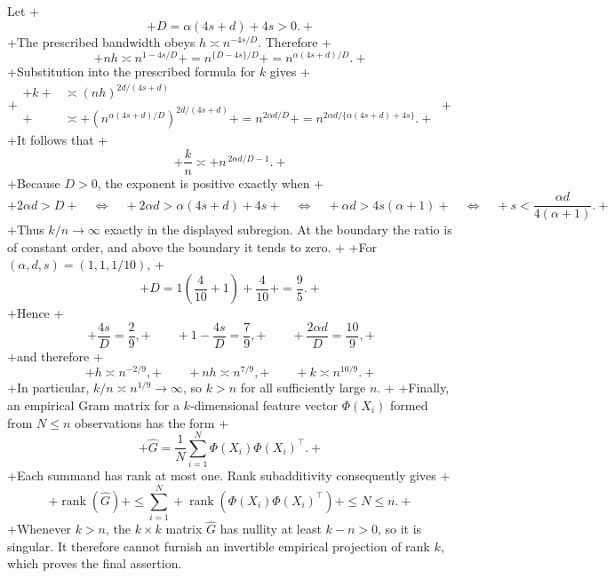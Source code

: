 Let
+\[
+D=\alpha(4s+d)+4s>0.
+\]
+The prescribed bandwidth obeys \(h\asymp n^{-4s/D}\). Therefore
+\[
+nh\asymp n^{1-4s/D}
+=n^{\{D-4s\}/D}
+=n^{\alpha(4s+d)/D}.
+\]
+Substitution into the prescribed formula for \(k\) gives
+\[
+\begin{aligned}
+k
+&\asymp(nh)^{2d/(4s+d)}\\
+&\asymp
+\left(n^{\alpha(4s+d)/D}\right)^{2d/(4s+d)}
+=n^{2\alpha d/D}
+=n^{2\alpha d/\{\alpha(4s+d)+4s\}}.
+\end{aligned}
+\]
+It follows that
+\[
+\frac{k}{n}\asymp
+n^{\,2\alpha d/D-1}.
+\]
+Because \(D>0\), the exponent is positive exactly when
+\[
+2\alpha d>D
+\quad\Longleftrightarrow\quad
+2\alpha d>\alpha(4s+d)+4s
+\quad\Longleftrightarrow\quad
+\alpha d>4s(\alpha+1)
+\quad\Longleftrightarrow\quad
+s<\frac{\alpha d}{4(\alpha+1)}.
+\]
+Thus \(k/n\to\infty\) exactly in the displayed subregion. At the boundary the ratio is of constant order, and above the boundary it tends to zero.
+
+For \((\alpha,d,s)=(1,1,1/10)\),
+\[
+D=1\left(\frac{4}{10}+1\right)+\frac{4}{10}
+=\frac95.
+\]
+Hence
+\[
+\frac{4s}{D}=\frac{2}{9},
+\qquad
+1-\frac{4s}{D}=\frac79,
+\qquad
+\frac{2\alpha d}{D}=\frac{10}{9},
+\]
+and therefore
+\[
+h\asymp n^{-2/9},
+\qquad
+nh\asymp n^{7/9},
+\qquad
+k\asymp n^{10/9}.
+\]
+In particular, \(k/n\asymp n^{1/9}\to\infty\), so \(k>n\) for all sufficiently large \(n\).
+
+Finally, an empirical Gram matrix for a \(k\)-dimensional feature vector \(\Phi(X_i)\) formed from \(N\le n\) observations has the form
+\[
+\widehat G=\frac1N\sum_{i=1}^N\Phi(X_i)\Phi(X_i)^\top.
+\]
+Each summand has rank at most one. Rank subadditivity consequently gives
+\[
+\operatorname{rank}(\widehat G)
+\le\sum_{i=1}^N
+\operatorname{rank}\!\left(\Phi(X_i)\Phi(X_i)^\top\right)
+\le N\le n.
+\]
+Whenever \(k>n\), the \(k\times k\) matrix \(\widehat G\) has nullity at least \(k-n>0\), so it is singular. It therefore cannot furnish an invertible empirical projection of rank \(k\), which proves the final assertion.